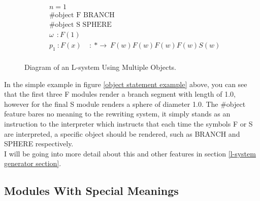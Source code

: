\begin{flushleft}
\vspace{5mm}

\begin{equation} \label{object statement example}
\begin{aligned}
	&n=1 \\
	&\textrm{\#object F BRANCH}\\
	&\textrm{\#object S SPHERE}\\
	&\omega~~ : F(1)\\
	&p_1~ :  F(x)~~~~~ :~ * \rightarrow~ F(w)F(w)F(w)F(w)S(w)\\
\end{aligned}
\end{equation}

\begin{figure}[htbp]
	{\centering
		\vspace{7px}
		\setlength{\fboxrule}{1pt}
		\caption{Diagram of an L-system Using Multiple Objects.}
	}
\end{figure}
\FloatBarrier

\vspace{5mm}

In the simple example in figure \ref{object statement example} above, you can see that the first three F modules render a branch segment with length of 1.0, however for the final S module renders a sphere of diameter 1.0. The \#object feature bares no meaning to the rewriting system, it simply stands as an instruction to the interpreter which instructs that each time the symbols F or S are interpreted, a specific object should be rendered, such as BRANCH and SPHERE respectively. \\     

I will be going into more detail about this and other features in section \ref{l-system generator section}.


\end{flushleft}

\subsection{Modules With Special Meanings}

